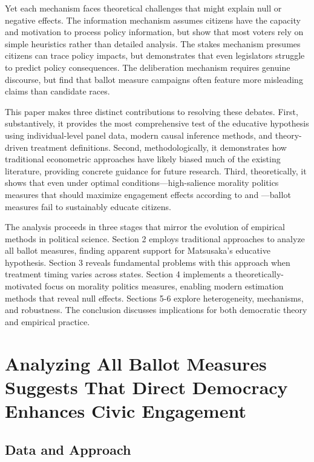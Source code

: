 \documentclass[12pt,letterpaper,oneside]{book}
\begin{document}
Yet each mechanism faces theoretical challenges that might explain null or negative effects. The information mechanism assumes citizens have the capacity and motivation to process policy information, but \citet{lupia1994shortcuts} show that most voters rely on simple heuristics rather than detailed analysis. The stakes mechanism presumes citizens can trace policy impacts, but \citet{arnold1990logic} demonstrates that even legislators struggle to predict policy consequences. The deliberation mechanism requires genuine discourse, but \citet{gerber1999populist} find that ballot measure campaigns often feature more misleading claims than candidate races.

This paper makes three distinct contributions to resolving these debates. First, substantively, it provides the most comprehensive test of the educative hypothesis using individual-level panel data, modern causal inference methods, and theory-driven treatment definitions. Second, methodologically, it demonstrates how traditional econometric approaches have likely biased much of the existing literature, providing concrete guidance for future research. Third, theoretically, it shows that even under optimal conditions—high-salience morality politics measures that should maximize engagement effects according to \citet{mooney2001public} and \citet{haider2006framing}—ballot measures fail to sustainably educate citizens.

The analysis proceeds in three stages that mirror the evolution of empirical methods in political science. Section 2 employs traditional approaches to analyze all ballot measures, finding apparent support for Matsusaka's educative hypothesis. Section 3 reveals fundamental problems with this approach when treatment timing varies across states. Section 4 implements a theoretically-motivated focus on morality politics measures, enabling modern estimation methods that reveal null effects. Sections 5-6 explore heterogeneity, mechanisms, and robustness. The conclusion discusses implications for both democratic theory and empirical practice.

\section{Analyzing All Ballot Measures Suggests That Direct Democracy Enhances Civic Engagement}

\subsection{Data and Approach}
\end{document}

